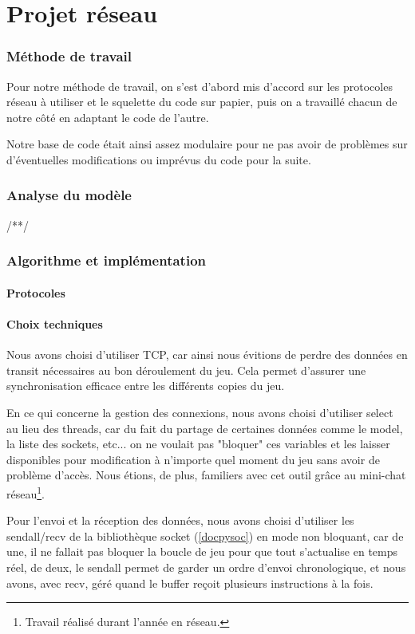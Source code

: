 \documentclass[a4paper]{article}
\begin{document}
\newpage
\part{Projet réseau}

	\section{Méthode de travail}

	Pour notre méthode de travail, on s'est d'abord mis d'accord sur les protocoles réseau à utiliser et le squelette du code sur papier, puis on a travaillé chacun de notre côté en adaptant le code de l'autre.

	Notre base de code était ainsi assez modulaire pour ne pas avoir de problèmes sur d'éventuelles modifications ou imprévus du code pour la suite.

	\section{Analyse du modèle}

	/**/

	\section{Algorithme et implémentation}
		\subsection{Protocoles}


		\subsection{Choix techniques}
		Nous avons choisi d'utiliser TCP, car ainsi nous évitions de perdre des données en transit nécessaires au bon déroulement du jeu. Cela permet d'assurer une synchronisation efficace entre les différents copies du jeu.

		En ce qui concerne la gestion des connexions, nous avons choisi d'utiliser select au lieu des threads, car du fait du partage de certaines données comme le model, la liste des sockets, etc... on ne voulait pas "bloquer" ces variables et les laisser disponibles pour modification à n'importe quel moment du jeu sans avoir de problème d'accès. Nous étions, de plus, familiers avec cet outil grâce au mini-chat réseau\footnote{Travail réalisé durant l'année en réseau.}.

		Pour l'envoi et la réception des données, nous avons choisi d'utiliser les sendall/recv de la bibliothèque socket (\ref{docpysoc}) en mode non bloquant, car de une, il ne fallait pas bloquer la boucle de jeu pour que tout s'actualise en temps réel, de deux, le sendall permet de garder un ordre d'envoi chronologique, et nous avons, avec recv, géré quand le buffer reçoit plusieurs instructions à la fois.
\end{document}
